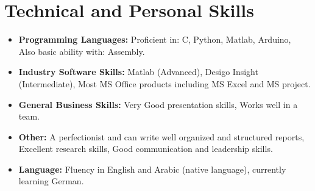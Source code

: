 \documentclass[11pt,a4paper,sans]{moderncv}        %
\begin{document}
\begin{itemize}


\end{itemize}

\newpage

\section{Technical and Personal Skills}

\vspace{6pt}

\begin{itemize}

\item \textbf{Programming Languages:} Proficient in: C, Python, Matlab, Arduino, \\ Also basic ability with: Assembly.

\vspace{6pt}

\item \textbf{Industry Software Skills:} Matlab (Advanced), Desigo Insight (Intermediate), Most MS Office products including MS Excel and MS project.

\vspace{6pt}

\item \textbf{General Business Skills:} Very Good presentation skills, Works well in a team.

\vspace{6pt}

\item {\textbf{Other:}} A perfectionist and can write well organized and structured reports, Excellent research skills, Good communication and leadership skills.

\vspace{6pt}

\item \textbf{Language:} Fluency in English and Arabic (native language), currently learning German.

\end{itemize}
\end{document}
